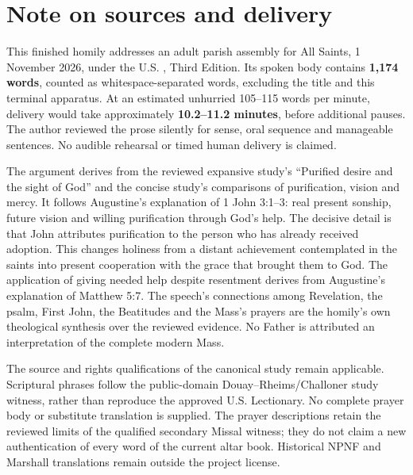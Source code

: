 \section{Note on sources and delivery}
This finished homily addresses an adult parish assembly for All Saints, 1 November 2026, under the U.S. , Third Edition. Its spoken body contains \textbf{1,174 words}, counted as whitespace-separated words, excluding the title and this terminal apparatus. At an estimated unhurried 105--115 words per minute, delivery would take approximately \textbf{10.2--11.2 minutes}, before additional pauses. The author reviewed the prose silently for sense, oral sequence and manageable sentences. No audible rehearsal or timed human delivery is claimed.

The argument derives from the reviewed expansive study's ``Purified desire and the sight of God'' and the concise study's comparisons of purification, vision and mercy. It follows Augustine's explanation of 1 John 3:1--3: real present sonship, future vision and willing purification through God's help. The decisive detail is that John attributes purification to the person who has already received adoption. This changes holiness from a distant achievement contemplated in the saints into present cooperation with the grace that brought them to God. The application of giving needed help despite resentment derives from Augustine's explanation of Matthew 5:7. The speech's connections among Revelation, the psalm, First John, the Beatitudes and the Mass's prayers are the homily's own theological synthesis over the reviewed evidence. No Father is attributed an interpretation of the complete modern Mass.

The source and rights qualifications of the canonical study remain applicable. Scriptural phrases follow the public-domain Douay--Rheims/Challoner study witness, rather than reproduce the approved U.S. Lectionary. No complete prayer body or substitute translation is supplied. The prayer descriptions retain the reviewed limits of the qualified secondary Missal witness; they do not claim a new authentication of every word of the current altar book. Historical NPNF and Marshall translations remain outside the project license.

